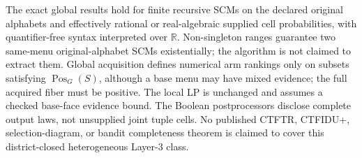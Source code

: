 \documentclass{article}
\begin{document}
The exact global results hold for finite recursive SCMs on the declared original alphabets and effectively rational or real-algebraic supplied cell probabilities, with quantifier-free syntax interpreted over \(\mathbb R\).  Non-singleton ranges guarantee two same-menu original-alphabet SCMs existentially; the algorithm is not claimed to extract them.  Global acquisition defines numerical arm rankings only on subsets satisfying \(\operatorname{Pos}_G(S)\), although a base menu may have mixed evidence; the full acquired fiber must be positive.  The local LP is unchanged and assumes a checked base-face evidence bound.  The Boolean postprocessors disclose complete output laws, not unsupplied joint tuple cells.  No published CTFTR, CTFIDU+, selection-diagram, or bandit completeness theorem is claimed to cover this district-closed heterogeneous Layer-3 class.
\end{document}
